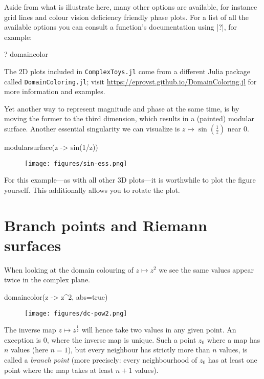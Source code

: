 \documentclass[a4paper]{article}
\begin{document}
Aside from what is illustrate here, many other options are available, for
instance grid lines and colour vision deficiency friendly phase plots. For a
list of all the available options you can consult a function's documentation
using \jlv|?|, for example:

\begin{juliaverbatim}
	? domaincolor
\end{juliaverbatim}

The 2D plots included in \texttt{ComplexToys.jl} come from a different Julia package
called \texttt{DomainColoring.jl}; visit
\url{https://eprovst.github.io/DomainColoring.jl} for more information and
examples.

Yet another way to represent magnitude and phase at the same time, is by moving
the former to the third dimension, which results in a (painted) modular surface.
Another essential singularity we can visualize is
$z \mapsto \sin\left(\frac{1}{z}\right)$ near $0$.

\begin{juliaverbatim}
	modularsurface(z -> sin(1/z))
\end{juliaverbatim}
\begin{figure}[H]
	\centering
	\texttt{[image: figures/sin-ess.png]}
\end{figure}

For this example---as with all other 3D plots---it is worthwhile to plot the
figure yourself. This additionally allows you to rotate the plot.

\section{Branch points and Riemann surfaces}

When looking at the domain colouring of $z \mapsto z^2$ we see the same values
appear twice in the complex plane.

\begin{juliaverbatim}
	domaincolor(z -> z^2, abs=true)
\end{juliaverbatim}
\begin{figure}[H]
	\centering
	\texttt{[image: figures/dc-pow2.png]}
\end{figure}

The inverse map $z \mapsto z^{\frac{1}{2}}$ will hence take two values in any
given point. An exception is $0$, where the inverse map is unique. Such a point
$z_0$ where a map has $n$ values (here $n=1$), but every neighbour has strictly
more than $n$ values, is called a \emph{branch point} (more precisely: every
neighbourhood of $z_0$ has at least one point where the map takes at least $n+1$
values).
\end{document}
